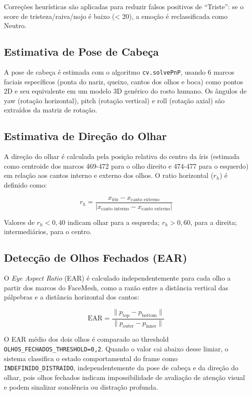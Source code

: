 \documentclass[
	12pt,
	openright,
	oneside,
	a4paper,
	english,
	brazil
	]{abntex2}
\begin{document}
Correções heurísticas são aplicadas para reduzir falsos positivos de ``Triste'': se o score de tristeza/raiva/nojo é baixo (< 20), a emoção é reclassificada como Neutro.

\subsection{Estimativa de Pose de Cabeça}

A pose de cabeça é estimada com o algoritmo \texttt{cv.solvePnP}, usando 6 marcos faciais específicos (ponta do nariz, queixo, cantos dos olhos e boca) como pontos 2D e seu equivalente em um modelo 3D genérico do rosto humano. Os ângulos de yaw (rotação horizontal), pitch (rotação vertical) e roll (rotação axial) são extraídos da matriz de rotação.

\subsection{Estimativa de Direção do Olhar}

A direção do olhar é calculada pela posição relativa do centro da íris (estimada como centroide dos marcos 469-472 para o olho direito e 474-477 para o esquerdo) em relação aos cantos interno e externo dos olhos. O ratio horizontal ($r_h$) é definido como:

\begin{equation}
r_h = \frac{x_{\text{íris}} - x_{\text{canto externo}}}{|x_{\text{canto interno}} - x_{\text{canto externo}}|}
\end{equation}

Valores de $r_h < 0,40$ indicam olhar para a esquerda; $r_h > 0,60$, para a direita; intermediários, para o centro.

\subsection{Detecção de Olhos Fechados (EAR)}

O \textit{Eye Aspect Ratio} (EAR) é calculado independentemente para cada olho a partir dos marcos do FaceMesh, como a razão entre a distância vertical das pálpebras e a distância horizontal dos cantos:

\begin{equation}
\text{EAR} = \frac{\|p_{\text{top}} - p_{\text{bottom}}\|}{\|p_{\text{outer}} - p_{\text{inner}}\|}
\end{equation}

O EAR médio dos dois olhos é comparado ao threshold \texttt{OLHOS\_FECHADOS\_THRESHOLD=0{,}2}. Quando o valor cai abaixo desse limiar, o sistema classifica o estado comportamental do frame como \texttt{INDEFINIDO\_DISTRAIDO}, independentemente da pose de cabeça e da direção do olhar, pois olhos fechados indicam impossibilidade de avaliação de atenção visual e podem sinalizar sonolência ou distração profunda.
\end{document}
